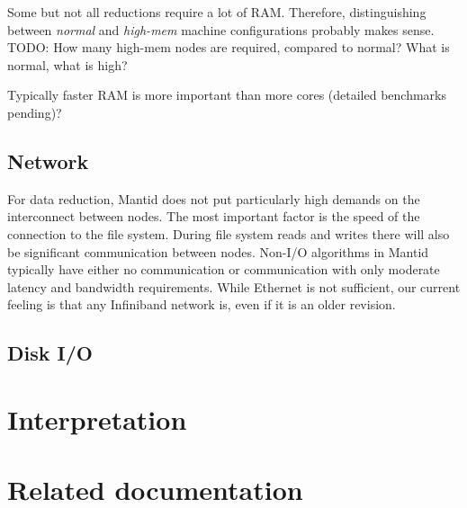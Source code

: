 \documentclass[a4paper,english,numbers=noenddot,bibliography=totoc,chapterprefix=on,DIV=12]{scrartcl}
\begin{document}
Some but not all reductions require a lot of RAM.
Therefore, distinguishing between \emph{normal} and \emph{high-mem} machine configurations probably makes sense.
TODO: How many high-mem nodes are required, compared to normal? What is normal, what is high?

Typically faster RAM is more important than more cores (detailed benchmarks pending)?

\subsection{Network}

For data reduction, Mantid does not put particularly high demands on the interconnect between nodes.
The most important factor is the speed of the connection to the file system.
During file system reads and writes there will also be significant communication between nodes.
Non-I/O algorithms in Mantid typically have either no communication or communication with only moderate latency and bandwidth requirements.
While Ethernet is not sufficient, our current feeling is that any Infiniband network is, even if it is an older revision.

\subsection{Disk I/O}



\section{Interpretation}




\appendix

\section{Related documentation}
\end{document}

